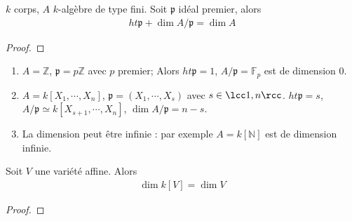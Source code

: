             \begin{theo}
                $k$ corps, $A$ $k$-algèbre de type fini. Soit $\mathfrak{p}$ idéal premier, alors 
                \begin{align*}
                    ht \mathfrak{p} + \dim A/\mathfrak{p} = \dim A
                \end{align*}
            \end{theo}
            \begin{proof}
            \end{proof}
            \begin{expl}
                \begin{enumerate}
                    \item $A = \mathbb{Z}$, $\mathfrak{p} = p \mathbb{Z}$ avec $p$ premier; Alors $ht \mathfrak{p} = 1$, $A/ \mathfrak{p} = \mathbb{F}_p$ est de dimension $0$.
                    \item $A = k[X_1, \cdots, X_n]$, $\mathfrak{p} = (X_1, \cdots, X_s)$ avec $s \in \lcc 1,n \rcc$. $ht \mathfrak{p} = s$, $A/\mathfrak{p} \simeq k[X_{s+1}, \cdots, X_n]$, $\dim A/\mathfrak{p} = n-s$.
                    \item La dimension peut être infinie : par exemple $A = k[\mathbb{N}]$ est de dimension infinie.
                \end{enumerate}
            \end{expl}
            \begin{theo}
                Soit $V$ une variété affine. Alors
                \begin{align*}
                    \dim k[V] = \dim V
                \end{align*}
            \end{theo}
            \begin{proof}
            \end{proof}

